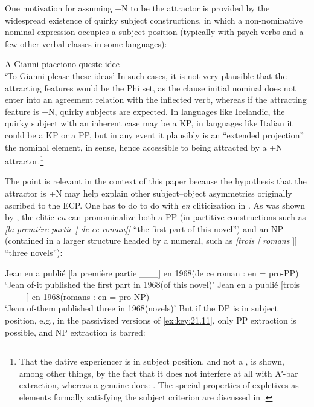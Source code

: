 \documentclass[output=paper]{langsci/langscibook}
\begin{document}
\begin{exe}
One motivation for assuming +N to be the attractor is provided by the
widespread existence of quirky subject constructions, in which a non-nominative
nominal expression occupies a subject position (typically with psych-verbs and
a few other verbal classes in some languages):

\ea%
    \label{ex:key:21.10}
    \sn A Gianni    piacciono   queste idee\\
    ‘To Gianni  please        these ideas’
\z
%
In such cases, it is not very plausible that the attracting features would be
the Phi set, as the clause initial nominal does not enter into an agreement
relation with the inflected verb, whereas if the attracting feature is +N,
quirky subjects are expected. In languages like Icelandic, the quirky subject
with an inherent case may be a KP, in languages like Italian it could be a KP
or a PP, but in any event it plausibly is an “extended projection” the nominal
element, in  sense, hence accessible to being attracted
by a +N attractor.\footnote{That the dative experiencer is in subject
    position, and not a , is shown, among other things, by the fact that it
    does not interfere at all with Aʹ-bar extraction, whereas a genuine  does:
\citealt{Calabrese1986,BellettiRizzi1988}. The special properties of
expletives as elements formally satisfying the subject criterion are discussed
in \citet{RizziShlonsky2007}.}

The point is relevant in the context of this paper because the hypothesis that
the attractor is +N may help explain other subject--object asymmetries
originally ascribed to the ECP.  One has to do to do with \emph{en}
cliticization in . As was shown by \citet{Ruwet1972}, the clitic
\emph{en} can pronominalize both a PP (in partitive constructions such as
\emph{[la} \emph{première} \emph{partie} \emph{[} \emph{de} \emph{ce}
\emph{roman]]} “the first part of this novel”) and an NP (contained in a larger
structure headed by a numeral, such as \emph{[trois} \emph{[}
\emph{romans} ]] “three novels”):

\ea%
    \label{ex:key:21.11}
    \ea Jean  en a publié [la première partie \_\_\_] en 1968\hfill (de ce roman : en = pro-PP)\\
        ‘Jean of-it published the first part in 1968\hfill (of this novel)’
    \ex Jean  en a publié [trois \_\_\_ ] en 1968\hfill (romans : en = pro-NP)\\
        ‘Jean of-them published three in 1968\hfill (novels)’
    \z
\z
%
But if the DP is in subject position, e.g., in the passivized versions of
\eqref{ex:key:21.11}, only PP extraction is possible, and NP extraction is
barred:


\end{exe}
\end{document}
